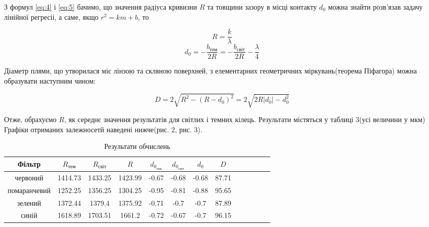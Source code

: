 З формул \ref{eq:4} і \ref{eq:5} бачимо, що значення радіуса 
кривизни $R$ та товщини зазору в місці контакту $d_0$ можна знайти 
розв'язав задачу лінійної регресіі, а саме, якщо $r^2 = k m + b$, то

$$ R = \frac{k}{\lambda} $$
$$ d_0 = - \frac{b_{тем}}{2R} = - \frac{b_{світ}}{2R} - \frac{\lambda}{4} $$

Діаметр плями, що утворилася міє лінзою та скляною поверхней, з елементарних
геометричних міркувань(теорема Піфагора) можна образувати наступним чином:

$$ D = 2 \sqrt{R^2 - (R-d_0)^2} = 2 \sqrt{2R|d_0| - d_0^2} $$

Отже, обрахуємо $R$, як середнє значення результатів для світлих і темних 
кілець. Результати містяться у таблиці 3(усі величини у мкм) Графіки отриманих залежносетй наведені нижче(рис. 2, рис. 3).

\begin{table}[h]
    \centering
    \begin{tabular}{|c|c|c|c|c|c|c|c|c|c|c|c|c|}
        \hline
        \textbf{Фільтр} & \textbf{$R_{тем}$} & \textbf{$R_{світ}$} & \textbf{$R$} &
        \textbf{$d_{0_{тем}}$} & \textbf{$d_{0_{світ}}$} & \textbf{$d_0$} & \textbf{$D$} \\
        \hline

        червоний & 1414.73 & 1433.25 & 1423.99 & -0.67 & -0.68 & -0.68 & 87.71 \\
        \hline
        
        помаранчевий & 1252.25 & 1356.25 & 1304.25 & -0.95 & -0.81 & -0.88 & 95.65 \\
        \hline
        
        зелений & 1372.44 & 1379.4 & 1375.92 & -0.71 & -0.7 & -0.7 & 87.89 \\
        \hline

        синій & 1618.89 & 1703.51 & 1661.2 & -0.72 & -0.67 & -0.7 & 96.15 \\
        \hline

    \end{tabular}
    \caption{Результати обчислень}
\end{table}



